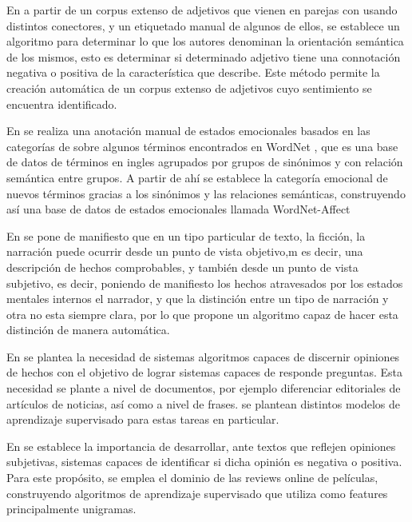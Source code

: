 En \cite{hatzivassiloglou1997predicting} a partir de un corpus extenso de adjetivos que vienen en parejas con usando distintos conectores, y un etiquetado manual de algunos de ellos, se establece un algoritmo para determinar lo que los autores denominan la orientación semántica de los mismos, esto es determinar si determinado adjetivo tiene una connotación negativa o positiva de la característica que describe. Este método permite la creación automática de un corpus extenso de adjetivos cuyo sentimiento se encuentra identificado.

En \cite{strapparava2004wordnet} se realiza una anotación manual de estados emocionales basados en las categorías de \cite{ortony1987referential} sobre algunos términos encontrados en WordNet \cite{miller1995wordnet}, que es una base de datos de términos en ingles agrupados por grupos de sinónimos y con relación semántica entre grupos. A partir de ahí se establece la categoría emocional de nuevos términos gracias a los sinónimos y las relaciones semánticas, construyendo así una base de datos de estados emocionales llamada WordNet-Affect

En \cite{wiebe1994tracking} se pone de manifiesto que en un tipo particular de texto, la ficción, la narración puede ocurrir desde un punto de vista objetivo,m es decir, una descripción de hechos comprobables, y también desde un punto de vista subjetivo, es decir, poniendo de manifiesto los hechos atravesados por los estados mentales internos el narrador, y que la distinción entre un tipo de narración y otra no esta siempre clara, por lo que propone un algoritmo capaz de hacer esta distinción de manera automática.


En \cite{yu2003towards} se plantea la necesidad de sistemas algoritmos capaces de discernir opiniones de hechos con el objetivo de lograr sistemas capaces de responde preguntas. Esta necesidad se plante a nivel de documentos, por ejemplo diferenciar editoriales de artículos de noticias, así como a nivel de frases. se plantean distintos modelos de aprendizaje supervisado para estas tareas en particular.



En \cite{pang2002thumbs} se establece la importancia de desarrollar, ante textos que reflejen opiniones subjetivas, sistemas capaces de identificar si dicha opinión es negativa o positiva. Para este propósito, se emplea el dominio de las reviews online de películas, construyendo algoritmos de aprendizaje supervisado que utiliza como features principalmente unigramas.

